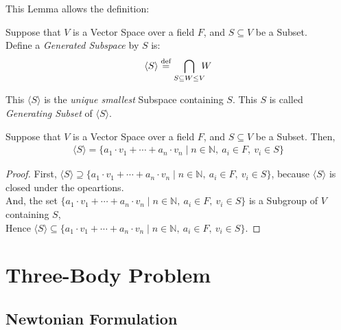 \documentclass[11pt]{article}
\theoremstyle{romanstyle}
\newcommand{\defequal}{\overset{\textnormal{def}}{=}}
\begin{document}
This Lemma allows the definition:
\begin{definition}
    Suppose that $V$ is a Vector Space over a field $F$, and $S \subseteq V$ be a Subset. \\
    Define a \textit{Generated Subspace} by $S$ is:
    \begin{align*}
        \langle S \rangle \defequal \bigcap_{S \subseteq W \leq V} \hspace{-0.2cm} W
    \end{align*}
\end{definition}
This $\langle S \rangle$ is the \textit{unique smallest} Subspace containing $S$. This $S$ is called \textit{Generating Subset} of $\langle S \rangle$.
\begin{lemma}
    Suppose that $V$ is a Vector Space over a field $F$, and $S \subseteq V$ be a Subset. Then,
    \begin{align*}
        \langle S \rangle = \{ a_1 \cdot v_1 + \cdots + a_n \cdot v_n \mid n \in \mathbb{N},\ a_i \in F,\ v_i \in S \}
    \end{align*}
\end{lemma}
\begin{proof}
    First, $\langle S \rangle \supseteq \{ a_1 \cdot v_1 + \cdots + a_n \cdot v_n \mid n \in \mathbb{N},\ a_i \in F,\ v_i \in S \}$, because $\langle S \rangle$ is closed under the opeartions. \\
    And, the set $\{ a_1 \cdot v_1 + \cdots + a_n \cdot v_n \mid n \in \mathbb{N},\ a_i \in F,\ v_i \in S \}$ is a Subgroup of $V$ containing $S$, \\
    Hence $\langle S \rangle \subseteq \{ a_1 \cdot v_1 + \cdots + a_n \cdot v_n \mid n \in \mathbb{N},\ a_i \in F,\ v_i \in S \}$.
\end{proof}


\newpage

\section{Three-Body Problem}
\subsection{Newtonian Formulation}
\end{document}
